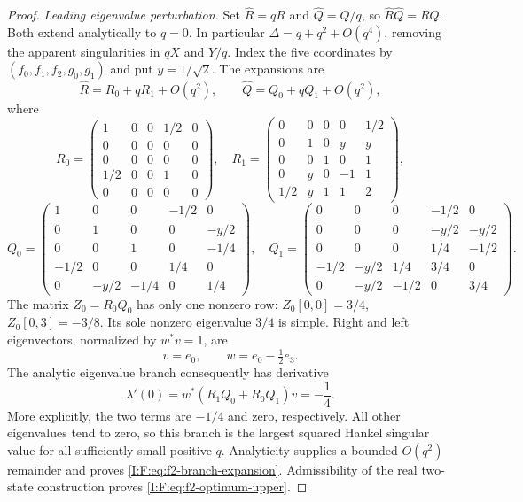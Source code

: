 \begin{proof}
\emph{Leading eigenvalue perturbation.}
Set $\widehat R=qR$ and $\widehat Q=Q/q$, so
$\widehat R\widehat Q=RQ$. Both extend analytically to $q=0$.
In particular $\Delta=q+q^2+O(q^4)$, removing the apparent
singularities in $qX$ and $Y/q$.
Index the five coordinates by $(f_0,f_1,f_2,g_0,g_1)$ and put
$y=1/\sqrt2$. The expansions are
\[
 \widehat R=R_0+qR_1+O(q^2),\qquad
 \widehat Q=Q_0+qQ_1+O(q^2),
\]
where
\begin{equation}
 R_0=\begin{pmatrix}
 1&0&0&1/2&0\\0&0&0&0&0\\0&0&0&0&0\\
 1/2&0&0&1&0\\0&0&0&0&0
 \end{pmatrix},\quad
 R_1=\begin{pmatrix}
 0&0&0&0&1/2\\0&1&0&y&y\\0&0&1&0&1\\
 0&y&0&-1&1\\1/2&y&1&1&2
 \end{pmatrix},
 \label{I:F:eq:f2-R-expansion}
\end{equation}
\begin{equation}
 Q_0=\begin{pmatrix}
 1&0&0&-1/2&0\\0&1&0&0&-y/2\\0&0&1&0&-1/4\\
 -1/2&0&0&1/4&0\\0&-y/2&-1/4&0&1/4
 \end{pmatrix},\quad
 Q_1=\begin{pmatrix}
 0&0&0&-1/2&0\\0&0&0&-y/2&-y/2\\0&0&0&1/4&-1/2\\
 -1/2&-y/2&1/4&3/4&0\\0&-y/2&-1/2&0&3/4
 \end{pmatrix}.
 \label{I:F:eq:f2-Q-expansion}
\end{equation}
The matrix $Z_0=R_0Q_0$ has only one nonzero row:
$Z_0[0,0]=3/4$, $Z_0[0,3]=-3/8$.
Its sole nonzero eigenvalue $3/4$ is simple. Right and left eigenvectors,
normalized by $w^*v=1$, are
\[
 v=e_0,\qquad w=e_0-\tfrac12 e_3.
\]
The analytic eigenvalue branch consequently has derivative
\begin{equation}
 \lambda'(0)=w^*(R_1Q_0+R_0Q_1)v=-\frac14.
 \label{I:F:eq:f2-eigen-derivative}
\end{equation}
More explicitly, the two terms are $-1/4$ and zero, respectively.
All other eigenvalues tend to zero, so this branch is the largest
squared Hankel singular value for all sufficiently small positive $q$.
Analyticity supplies a bounded $O(q^2)$ remainder and proves
\eqref{I:F:eq:f2-branch-expansion}. Admissibility of the real two-state
construction proves \eqref{I:F:eq:f2-optimum-upper}.
\end{proof}
